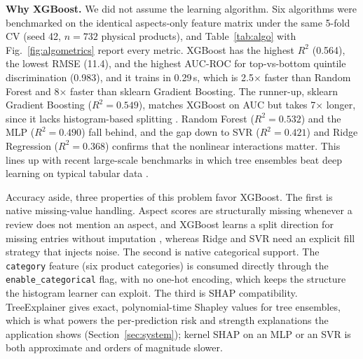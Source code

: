 \documentclass[journal]{IEEEtran}
\begin{document}
\textbf{Why XGBoost.} We did not assume the learning algorithm. Six algorithms were benchmarked on the identical aspects-only feature matrix under the same 5-fold CV (seed 42, $n = 732$ physical products), and Table~\ref{tab:algo} with Fig.~\ref{fig:algometrics} report every metric. XGBoost has the highest $R^2$ (0.564), the lowest RMSE (11.4), and the highest AUC-ROC for top-vs-bottom quintile discrimination (0.983), and it trains in 0.29\,s, which is 2.5$\times$ faster than Random Forest and 8$\times$ faster than sklearn Gradient Boosting. The runner-up, sklearn Gradient Boosting ($R^2 = 0.549$), matches XGBoost on AUC but takes 7$\times$ longer, since it lacks histogram-based splitting \cite{ke2017lightgbm}. Random Forest \cite{breiman2001random} ($R^2 = 0.532$) and the MLP ($R^2 = 0.490$) fall behind, and the gap down to SVR \cite{cortes1995svm} ($R^2 = 0.421$) and Ridge Regression \cite{hoerl1970ridge} ($R^2 = 0.368$) confirms that the nonlinear interactions matter. This lines up with recent large-scale benchmarks in which tree ensembles beat deep learning on typical tabular data \cite{grinsztajn2022tree,shwartzziv2022tabular}.

Accuracy aside, three properties of this problem favor XGBoost. The first is native missing-value handling. Aspect scores are structurally missing whenever a review does not mention an aspect, and XGBoost learns a split direction for missing entries without imputation \cite{chen2016xgboost}, whereas Ridge and SVR need an explicit fill strategy that injects noise. The second is native categorical support. The \texttt{category} feature (six product categories) is consumed directly through the \texttt{enable\_categorical} flag, with no one-hot encoding, which keeps the structure the histogram learner can exploit. The third is SHAP compatibility. TreeExplainer \cite{lundberg2017shap} gives exact, polynomial-time Shapley values for tree ensembles, which is what powers the per-prediction risk and strength explanations the application shows (Section~\ref{sec:system}); kernel SHAP on an MLP or an SVR is both approximate and orders of magnitude slower.
\end{document}
